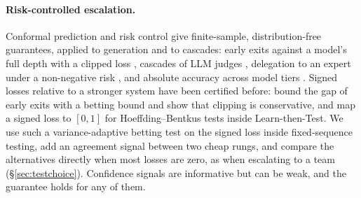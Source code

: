 \paragraph{Risk-controlled escalation.}
Conformal prediction and risk control \citep{vovk2005algorithmic,angelopoulos2024crc,angelopoulos2021ltt}
give finite-sample, distribution-free guarantees, applied to generation
\citep{quach2024conformal,mohri2024factuality} and to cascades: early exits against a model's full depth
with a clipped loss \citep{schuster2022calm}, cascades of LLM judges \citep{jung2025trust}, delegation to an
expert under a non-negative risk \citep{pona2026calibrate}, and absolute accuracy across model tiers
\citep{dou2026conformalcascade}. Signed losses relative to a stronger system have been certified before:
\citet{jazbec2024fastyetsafe} bound the gap of early exits with a betting bound
\citep{waudbysmith2024betting} and show that clipping is conservative, and \citet{wynn2026corrupted} map a
signed loss to $[0, 1]$ for Hoeffding--Bentkus tests inside Learn-then-Test. We use such a variance-adaptive betting test on the signed loss inside fixed-sequence testing, add an
agreement signal between two cheap rungs, and compare the alternatives directly when most losses are zero,
as when escalating to a team (\S\ref{sec:testchoice}). Confidence signals
\citep{kadavath2022know,kuhn2023semantic,xiong2024uncertainty,wang2023selfconsistency} are informative but
can be weak, and the guarantee holds for any of them.
